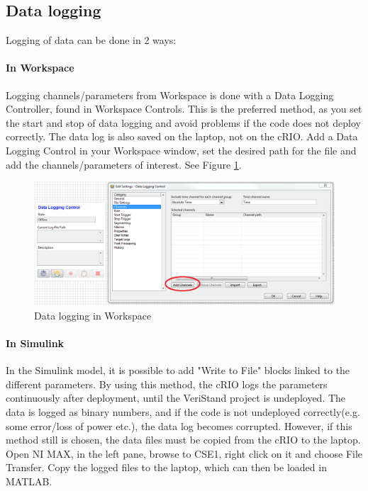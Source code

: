 \subsection{Data logging}
Logging of data can be done in 2 ways:
\paragraph{In Workspace}
Logging channels/parameters from Workspace is done with a Data Logging Controller, found in Workspace Controls. This is the preferred method, as you set the start and stop of data logging and avoid problems if the code does not deploy correctly. The data log is also saved on the laptop, not on the cRIO. Add a Data Logging Control in your Workspace window, set the desired path for the file and add the channels/parameters of interest. See Figure \ref{fig:data_logging}. 
\begin{figure}[htb!]
	\centering
	\includegraphics[scale=0.5]{fig/data_logging.png}
	\caption{Data logging in Workspace}
	\label{fig:data_logging}
\end{figure}
\paragraph{In Simulink}
In the Simulink model, it is possible to add "Write to File" blocks linked to the different parameters. By using this method, the cRIO logs the parameters continuously after deployment, until the VeriStand project is undeployed. The data is logged as binary numbers, and if the code is not undeployed correctly(e.g. some error/loss of power etc.), the data log becomes corrupted. However, if this method still is chosen, the data files must be copied from the cRIO to the laptop. Open NI MAX, in the left pane, browse to CSE1, right click on it and choose File Transfer. Copy the logged files to the laptop, which can then be loaded in MATLAB. 
